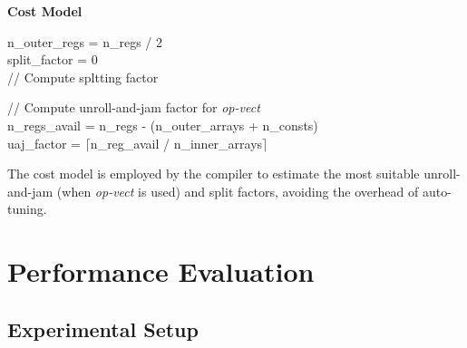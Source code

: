 \documentclass[conference]{IEEEtran}
\begin{document}
\begin{algorithm}[t]
  \textbf{Cost Model}\\

n\_outer\_regs = n\_regs / 2 \\
split\_factor = 0 \\
// Compute spltting factor \\

// Compute unroll-and-jam factor for \emph{op-vect} \\
n\_regs\_avail = n\_regs - (n\_outer\_arrays + n\_consts)\\
uaj\_factor = $\lceil$n\_reg\_avail / n\_inner\_arrays$\rceil$ \\
\caption{The cost model is employed by the compiler to estimate the most suitable unroll-and-jam (when \emph{op-vect} is used) and split factors, avoiding the overhead of auto-tuning.}
\label{algo:applyCostModel}
\end{algorithm}


\section{Performance Evaluation}
\label{sec:perf-results}

\subsection{Experimental Setup}
\end{document}
